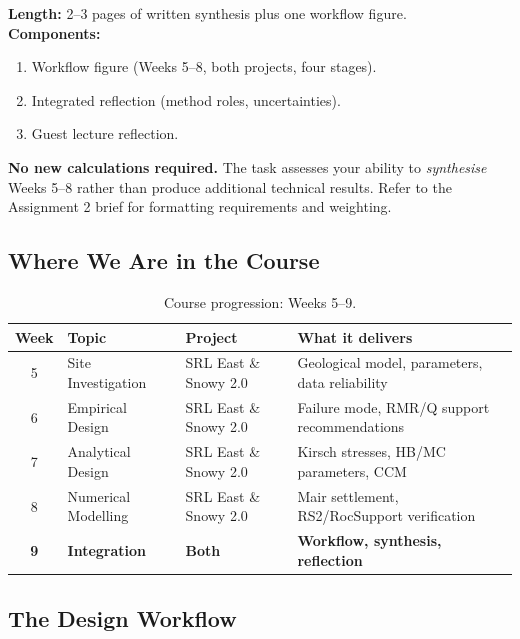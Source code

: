 \documentclass[a4paper,12pt]{article}
\begin{document}
\begin{deliverablebox}
\textbf{Length:} 2--3 pages of written synthesis plus one workflow figure. \\
\textbf{Components:}
\begin{enumerate}[nosep, label=(\arabic*)]
    \item Workflow figure (Weeks 5--8, both projects, four stages).
    \item Integrated reflection (method roles, uncertainties).
    \item Guest lecture reflection.
\end{enumerate}
\vspace{0.5 em}

\textbf{No new calculations required.} The task assesses your ability to \textit{synthesise} Weeks 5--8 rather than produce additional technical results. Refer to the Assignment 2 brief for formatting requirements and weighting.
\end{deliverablebox}

\subsection{Where We Are in the Course}
\begin{table}[h!]
\centering
\begin{tabularx}{\textwidth}{c l l X}
\toprule
\textbf{Week} & \textbf{Topic} & \textbf{Project} & \textbf{What it delivers} \\
\midrule
5 & Site Investigation & SRL East \& Snowy 2.0 & Geological model, parameters, data reliability \\
6 & Empirical Design & SRL East \& Snowy 2.0 & Failure mode, RMR/Q support recommendations \\
7 & Analytical Design & SRL East \& Snowy 2.0 & Kirsch stresses, HB/MC parameters, CCM \\
8 & Numerical Modelling & SRL East \& Snowy 2.0 & Mair settlement, RS2/RocSupport verification \\
\textbf{9} & \textbf{Integration} & \textbf{Both} & \textbf{Workflow, synthesis, reflection} \\
\bottomrule
\end{tabularx}
\caption{Course progression: Weeks 5--9.}
\end{table}

\subsection{The Design Workflow}
\end{document}

